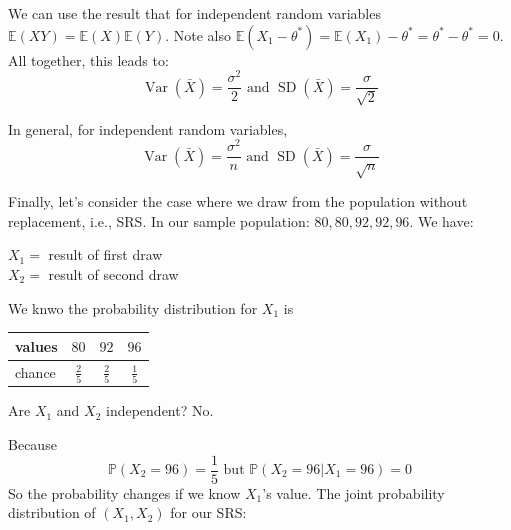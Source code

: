 \documentclass{tufte-handout}
\renewcommand{\P}[0]{\mathbb{P}}
\newcommand{\E}[0]{\mathbb{E}}
\DeclareMathOperator{\Var}{Var}
\DeclareMathOperator{\SD}{SD}
\begin{document}
We can use the result that for independent random variables $\E(XY) = \E(X)\E(Y)$. 
Note also $\E(X_1 - \theta^*) = \E(X_1) - \theta^* = \theta^* - \theta^* = 0$. All together, this leads to: \begin{equation*}
	\Var(\bar X) = \frac{\sigma^2}{2} \text{ and } \SD(\bar X) = \frac{\sigma}{\sqrt{2}}
\end{equation*}

In general, for independent random variables, \begin{equation*}
	\Var(\bar X) = \frac{\sigma^2}{n} \text{ and } \SD(\bar X) = \frac{\sigma}{\sqrt{n}}
\end{equation*}

Finally, let's consider the case where we draw from the population without replacement, i.e., SRS. In our sample population: $80,80,92,92,96$. We have:\begin{center}
	$X_1 = $ result of first draw \\
	$X_2 = $ result of second draw \\
\end{center}
We knwo the probability distribution for $X_1$ is   	\begin{tabular}{l|ccc}
  values & $80$& $92$ & $96$\\
  \hline
  chance & $\frac{2}{5}$ &$\frac{2}{5}$&$\frac{1}{5}$ \\
\end{tabular}

Are $X_1$ and $X_2$ independent? No.

Because \begin{equation*}
	\P(X_2 = 96) = \frac{1}{5} \text{ but } \P(X_2 = 96 | X_1 = 96) = 0
\end{equation*}
So the probability changes if we know $X_1$'s value. The joint probability distribution of $(X_1, X_2)$ for our SRS:
\end{document}

